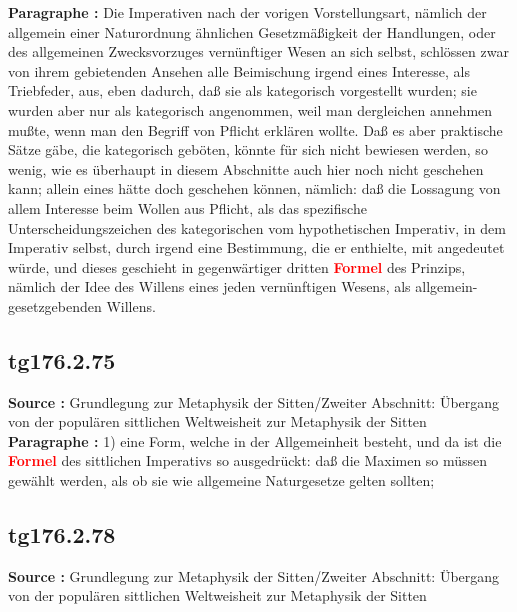 \documentclass[a4paper,12pt,twoside]{book}
\newcommand{\match}[1]{\textcolor{red}{\textbf{#1}}}
\begin{document}
	\noindent\textbf{Paragraphe : }Die Imperativen nach der vorigen Vorstellungsart, nämlich der allgemein einer Naturordnung ähnlichen Gesetzmäßigkeit der Handlungen, oder des allgemeinen Zwecksvorzuges vernünftiger Wesen an sich selbst, schlössen zwar von ihrem gebietenden Ansehen alle Beimischung irgend eines Interesse, als Triebfeder, aus, eben dadurch, daß sie als kategorisch vorgestellt wurden; sie wurden aber nur als kategorisch angenommen, weil man dergleichen annehmen mußte, wenn man den Begriff von Pflicht erklären wollte. Daß es aber praktische Sätze gäbe, die kategorisch geböten, könnte für sich nicht bewiesen werden, so wenig, wie es überhaupt in diesem Abschnitte auch hier noch nicht geschehen kann; allein eines hätte doch geschehen können, nämlich: daß die Lossagung von allem Interesse beim Wollen aus Pflicht, als das spezifische Unterscheidungszeichen des kategorischen vom hypothetischen Imperativ, in dem Imperativ selbst, durch irgend eine Bestimmung, die er enthielte, mit angedeutet würde, und dieses geschieht in gegenwärtiger dritten \match{Formel} des Prinzips, nämlich der Idee des Willens eines jeden vernünftigen Wesens, als allgemein-gesetzgebenden Willens. 
	
	\subsection*{tg176.2.75} 
	\textbf{Source : }Grundlegung zur Metaphysik der Sitten/Zweiter Abschnitt: Übergang von der populären sittlichen Weltweisheit zur Metaphysik der Sitten\\  
	
	\noindent\textbf{Paragraphe : }1) eine Form, welche in der Allgemeinheit besteht, und da ist die \match{Formel} des sittlichen Imperativs so ausgedrückt:  daß die Maximen so müssen gewählt werden, als ob sie wie allgemeine Naturgesetze gelten sollten; 
	
	\subsection*{tg176.2.78} 
	\textbf{Source : }Grundlegung zur Metaphysik der Sitten/Zweiter Abschnitt: Übergang von der populären sittlichen Weltweisheit zur Metaphysik der Sitten\\  
	
\end{document}
